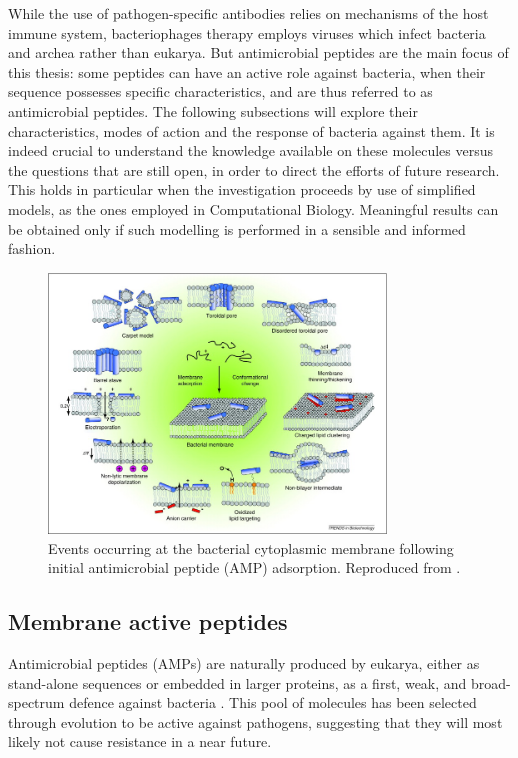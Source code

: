While the use of pathogen-specific antibodies relies on mechanisms of the host immune system, bacteriophages therapy employs viruses which infect bacteria and archea rather than eukarya.
%
But antimicrobial peptides are the main focus of this thesis: some peptides can have an active role against bacteria, when their sequence possesses specific characteristics, and are thus referred to as antimicrobial peptides. The following subsections will explore their characteristics, modes of action and the response of bacteria against them. It is indeed crucial to understand the knowledge available on these molecules versus the questions that are still open, in order to direct the efforts of future research. This holds in particular when the investigation proceeds by use of simplified models, as the ones employed in Computational Biology. Meaningful results can be obtained only if such modelling is performed in a sensible and informed fashion.

\begin{figure}
\begin{center}
\includegraphics[width = 0.8\textwidth]{1introduction/pics/amp_mech.jpg}
\caption[Modes of action of antimicrobial peptides]{Events occurring at the bacterial cytoplasmic membrane following initial antimicrobial peptide (AMP) adsorption. Reproduced from \citet{Nguyen2011}.} \label{fig:amp}
\end{center}
\end{figure}


\subsection{Membrane active peptides} \label{sec:host-defense-peptides}
Antimicrobial peptides (AMPs) are naturally produced by eukarya, either as stand-alone sequences or embedded in larger proteins, as a first, weak, and broad-spectrum defence against bacteria \citep{Nguyen2011}.
%
This pool of molecules has been selected through evolution to be active against pathogens, suggesting that they will most likely not cause resistance in a near future.


